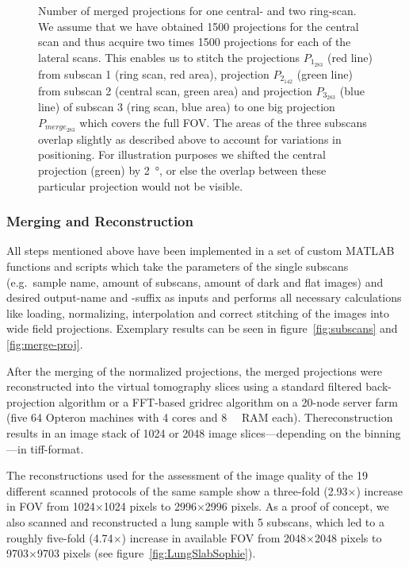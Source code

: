 \begin{figure*}
	\centering
	\caption[Number of merged projections for one central- and two ring-scan.]{Number of merged projections for one central- and two ring-scan. We assume that we have obtained 1500 projections for the central scan and thus acquire two times 1500 projections for each of the lateral scans. This enables us to stitch the projections $P_{1_{283}}$ %
    (red line) from subscan 1 (ring scan, red area), projection $P_{2_{142}}$ %
    (green line) from subscan 2 (central scan, green area) and projection $P_{3_{283}}$ %
    (blue line) of subscan 3 (ring scan, blue area) to one big projection $P_{merge_{283}}$ %
    which covers the full FOV. The areas of the three subscans overlap slightly as described above to account for variations in positioning. For illustration purposes we shifted the central projection (green) by \SI{2}{\degree}, or else the overlap between these particular projection would not be visible.}%
	\label{fig:amount of projections}%
\end{figure*}

\subsubsection{Merging and Reconstruction}
All steps mentioned above have been implemented in a set of custom MATLAB functions and scripts which take the parameters of the single subscans (e.g.\ sample name, amount of subscans, amount of dark and flat images) and desired output-name and -suffix as inputs and performs all necessary calculations like loading, normalizing, interpolation and correct stitching of the images into wide field projections. Exemplary results can be seen in figure~\ref{fig:subscans} and \ref{fig:merge-proj}.

After the merging of the normalized projections, the merged projections were reconstructed into the virtual tomography slices using a standard filtered back-projection algorithm or a FFT-based gridrec algorithm on a 20-node server farm (five \SI{64}{\bit} Opteron machines with 4 cores and \SI{8}{\giga\byte} RAM each). Thereconstruction results in an image stack of 1024 or 2048 image slices---depending on the binning---in tiff-format.

The reconstructions used for the assessment of the image quality of the 19 different scanned protocols of the same sample show a three-fold (2.93\(\times\)) increase in FOV from 1024\(\times\)1024 pixels to 2996\(\times\)2996 pixels. As a proof of concept, we also scanned and reconstructed a lung sample with 5 subscans, which led to a roughly five-fold (4.74\(\times\)) increase in available FOV from 2048\(\times\)2048 pixels to 9703\(\times\)9703 pixels (see figure~\ref{fig:LungSlabSophie}).